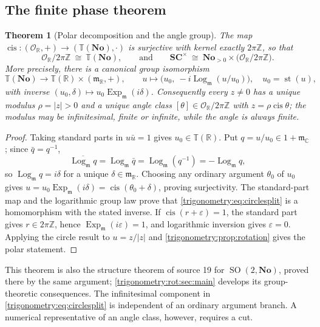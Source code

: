\documentclass[11pt,letterpaper]{article}
\numberwithin{equation}{section}
\newtheorem{theorem}{Theorem}[section]
\theoremstyle{definition}
\theoremstyle{remark}
\newcommand{\No}{\mathbf{No}}
\newcommand{\SC}{\mathbf{SC}}
\newcommand{\R}{\mathbb R}
\newcommand{\C}{\mathbb C}
\newcommand{\Z}{\mathbb Z}
\newcommand{\OO}{\mathcal O}
\newcommand{\mm}{\mathfrak m}
\newcommand{\TT}{\mathbb T}
\newcommand{\eps}{\varepsilon}
\newcommand{\st}{\operatorname{st}}
\newcommand{\cis}{\operatorname{cis}}
\newcommand{\Ex}{\operatorname{Exp}_{\mm}}
\newcommand{\Logm}{\operatorname{Log}_{\mm}}
\newcommand{\SO}{\operatorname{SO}}
\begin{document}
\subsection{The finite phase theorem}
\begin{theorem}[Polar decomposition and the angle group]\label{trigonometry:thm:polar}
The map $\cis:(\OO_{\R},+)\to(\TT(\No),\cdot)$ is surjective with kernel exactly $2\pi\Z$, so that
\begin{equation}\label{trigonometry:eq:anglegroup}
 \OO_{\R}/2\pi\Z\ \cong\ \TT(\No),
 \qquad\text{and}\qquad
 \SC^\times\ \cong\ \No_{>0}\times\bigl(\OO_{\R}/2\pi\Z\bigr).
\end{equation}
More precisely, there is a canonical group isomorphism
\begin{equation}\label{trigonometry:eq:circlesplit}
 \TT(\No)\longrightarrow\TT(\R)\times(\mm_{\R},+),\qquad
 u\longmapsto\bigl(u_0,\ -i\Logm(u/u_0)\bigr),\quad u_0=\st(u),
\end{equation}
with inverse $(u_0,\delta)\mapsto u_0\Ex(i\delta)$. Consequently every $z\ne0$ has a unique
modulus $\rho=|z|>0$ and a unique angle class $[\theta]\in\OO_{\R}/2\pi\Z$ with $z=\rho\cis\theta$;
the modulus may be infinitesimal, finite or infinite, while the angle is always finite.
\end{theorem}
\begin{proof}
Taking standard parts in $u\bar u=1$ gives $u_0\in\TT(\R)$. Put $q=u/u_0\in1+\mm_{\C}$; since
$\bar q=q^{-1}$,
\[
 \overline{\Logm q}=\Logm\bar q=\Logm(q^{-1})=-\Logm q,
\]
so $\Logm q=i\delta$ for a unique $\delta\in\mm_{\R}$. Choosing any ordinary argument $\theta_0$
of $u_0$ gives $u=u_0\Ex(i\delta)=\cis(\theta_0+\delta)$, proving surjectivity. The standard-part
map and the logarithmic group law prove that \cref{trigonometry:eq:circlesplit} is a homomorphism
with the stated inverse. If $\cis(r+\eps)=1$, the standard part gives $r\in2\pi\Z$, hence
$\Ex(i\eps)=1$, and logarithmic inversion gives $\eps=0$. Applying the circle result to $u=z/|z|$
and \cref{trigonometry:prop:rotation} gives the polar statement.
\end{proof}

This theorem is also the structure theorem of source 19 for $\SO(2,\No)$, proved there by the same
argument; \cref{trigonometry:rot:sec:main} develops its group-theoretic consequences.
The infinitesimal component in \cref{trigonometry:eq:circlesplit} is independent of an ordinary
argument branch. A numerical representative of an angle class, however, requires a cut.
\end{document}
